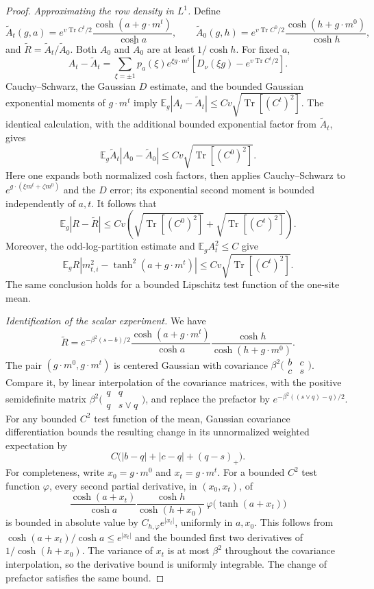 \documentclass[11pt,reqno]{amsart}
\begin{document}
\begin{proof}
\medskip\noindent\emph{Approximating the row density in $L^1$.}
Define
\[
 \widetilde A_t(g,a)=e^{v\operatorname{Tr}C^t/2}
              \frac{\cosh(a+g\cdot m^t)}{\cosh a},\qquad
 \widetilde A_0(g,h)=e^{v\operatorname{Tr}C^0/2}
              \frac{\cosh(h+g\cdot m^0)}{\cosh h},
\]
and $\widetilde R=\widetilde A_t/\widetilde A_0$.
Both $A_0$ and $\widetilde A_0$ are at least $1/\cosh h$.
For fixed $a$,
\[
 A_t-\widetilde A_t
 =\sum_{\xi=\pm1}p_a(\xi)e^{\xi g\cdot m^t}
       [D_\nu(\xi g)-e^{v\operatorname{Tr}C^t/2}].
\]
Cauchy--Schwarz, the Gaussian $D$ estimate, and the bounded Gaussian
exponential moments of $g\cdot m^t$ imply
$\mathbb E_g|A_t-\widetilde A_t|
\le Cv\sqrt{\operatorname{Tr}[(C^t)^2]}$.
The identical calculation, with the additional bounded exponential factor
from $\widetilde A_t$, gives
\[
 \mathbb E_g\widetilde A_t|A_0-\widetilde A_0|
 \le Cv\sqrt{\operatorname{Tr}[(C^0)^2]}.
\]
Here one expands both normalized cosh factors, then applies Cauchy--Schwarz
to $e^{g\cdot(\xi m^t+\zeta m^0)}$ and the $D$ error; its exponential
second moment is bounded independently of $a,t$.
It follows that
\[
 \mathbb E_g|R-\widetilde R|
 \le Cv\left(\sqrt{\operatorname{Tr}[(C^0)^2]}
             +\sqrt{\operatorname{Tr}[(C^t)^2]}\right).
\]
Moreover, the odd-log-partition estimate and
$\mathbb E_g A_t^2\le C$ give
\[
 \mathbb E_g R\left|m_{t,i}^2-\tanh^2(a+g\cdot m^t)\right|
 \le Cv\sqrt{\operatorname{Tr}[(C^t)^2]}.
\]
The same conclusion holds for a bounded Lipschitz test function of the
one-site mean.

\medskip\noindent\emph{Identification of the scalar experiment.}
We have
\[
 \widetilde R=e^{-\beta^2(s-b)/2}
 \frac{\cosh(a+g\cdot m^t)}{\cosh a}
 \frac{\cosh h}{\cosh(h+g\cdot m^0)}.
\]
The pair $(g\cdot m^0,g\cdot m^t)$ is centered Gaussian with covariance
$\beta^2\bigl(\begin{smallmatrix}b&c\\c&s\end{smallmatrix}\bigr)$.
Compare it, by linear interpolation of the covariance matrices, with the
positive semidefinite matrix
$\beta^2\bigl(\begin{smallmatrix}q&q\\q&s\vee q\end{smallmatrix}\bigr)$,
and replace the prefactor by $e^{-\beta^2((s\vee q)-q)/2}$.
For any bounded $C^2$ test function of the mean, Gaussian covariance
differentiation bounds the resulting change in its unnormalized weighted
expectation by
\[
 C\bigl(|b-q|+|c-q|+(q-s)_+\bigr).
\]
For completeness, write $x_0=g\cdot m^0$ and
$x_t=g\cdot m^t$. For a bounded $C^2$ test function $\varphi$, every
second partial derivative, in $(x_0,x_t)$, of
\[
 \frac{\cosh(a+x_t)}{\cosh a}
 \frac{\cosh h}{\cosh(h+x_0)}\,
 \varphi\bigl(\tanh(a+x_t)\bigr)
\]
is bounded in absolute value by $C_{h,\varphi}e^{|x_t|}$, uniformly in
$a,x_0$. This follows from
$\cosh(a+x_t)/\cosh a\le e^{|x_t|}$ and the bounded first two
derivatives of $1/\cosh(h+x_0)$.
The variance of $x_t$ is at most $\beta^2$ throughout the covariance
interpolation, so the derivative bound is uniformly integrable.
The change of prefactor satisfies the same bound.


\end{proof}
\end{document}
